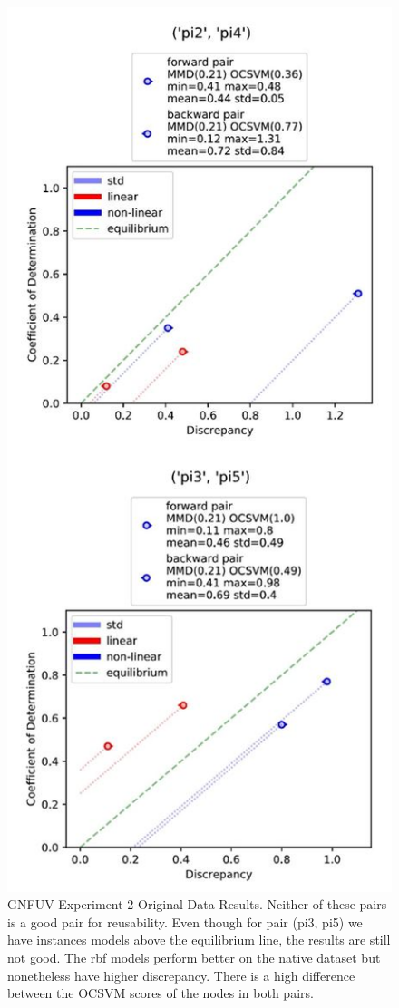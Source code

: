 \documentclass{mpaper}
\begin{document}
\begin{figure}
    \begin{center}
        \includegraphics[scale = 0.6]{experiment_2.jpg}
    \end{center}
    \caption{GNFUV Experiment 2 Original Data Results. Neither of these pairs is a good pair for reusability. Even though for pair (pi3, pi5) we have instances models above the equilibrium line, the results are still not good. The rbf models perform better on the native dataset but nonetheless have higher discrepancy. There is a high difference between the OCSVM scores of the nodes in both pairs.}
    \label{fig:gnfuv_exp2}
\end{figure}
\end{document}
